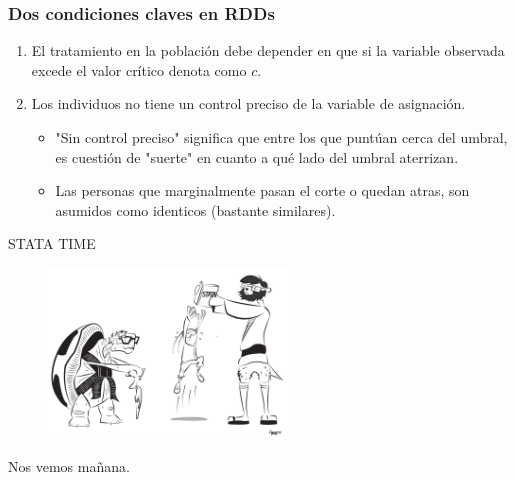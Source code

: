 \documentclass[10pt, aspectratio=169, compress]{beamer}
\makeatletter
\def\beamer@writeslidentry@miniframesoff{%
	\expandafter\beamer@ifempty\expandafter{\beamer@framestartpage}{}%
	{%
		\clearpage\beamer@notesactions%
	}
}
\newcommand*{\miniframesoff}{\let\beamer@writeslidentry=\beamer@writeslidentry@miniframesoff}
\makeatother
\begin{document}
\begin{frame}
	\frametitle{Dos condiciones claves en RDDs}

	\begin{enumerate}
		\item El tratamiento en la población debe depender en que si la variable observada excede el valor crítico denota como $c$.
		\item Los individuos no tiene un control preciso de la variable de asignación.
		\begin{itemize}
			\item "Sin control preciso" significa que entre los que puntúan cerca del umbral, es cuestión de "suerte" en cuanto a qué lado del umbral aterrizan.
			\item Las personas que marginalmente pasan el corte o quedan atras, son asumidos como identicos (bastante similares).
		\end{itemize}
	\end{enumerate}

\end{frame}

\miniframesoff 	

\begin{frame}
	\begin{center}
	\LARGE STATA TIME
		\begin{figure}[H]
			\includegraphics[width=0.57\textwidth]{stata.pdf}
		\end{figure}
	\end{center}
\end{frame}
\begin{frame}
	Nos vemos mañana.
\end{frame}
\end{document}
